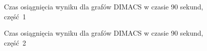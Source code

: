 \documentclass[12pt, a4paper]{article}
\begin{document}
\begin{figure}[H]
  \begin{center}
  \end{center}
  \caption{Czas osiągnięcia wyniku dla grafów DIMACS w czasie 90 sekund, część 1}
  \label{fig:dimacs-best-time-part1}
\end{figure}

\begin{figure}[H]
  \begin{center}
  \end{center}
  \caption{Czas osiągnięcia wyniku dla grafów DIMACS w czasie 90 sekund, część 2}
  \label{fig:dimacs-best-time-part2}
\end{figure}
\end{document}

